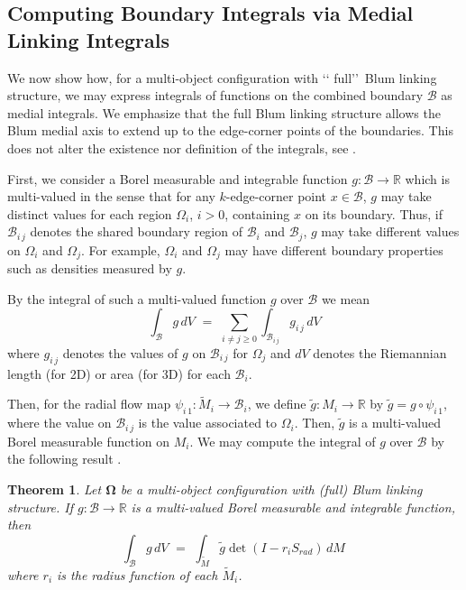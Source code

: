 \documentclass[10pt]{amsart}
\newtheorem{Thm}{Theorem}[section] \newtheorem{TitleThm}[Thm]{}
\theoremstyle{definition}
\theoremstyle{definition}
\numberwithin{equation}{section}
\newcommand{\R}{{\mathbb R}}
\def \bgW {\boldsymbol \Omega}
\def \cB {\mathcal{B}}
\def \gW {\Omega}
\begin{document}
\subsection*{Computing Boundary Integrals via Medial Linking Integrals} 
\par
We now show how, for a multi-object configuration with \lq\lq 
full\rq\rq\, Blum linking structure, we may express integrals of functions 
on the combined boundary $\cB$ as medial integrals.  We emphasize that 
the full Blum linking structure allows the Blum medial axis to extend up 
to the edge-corner points of the boundaries.  This does not alter the 
existence nor definition of the integrals, see \cite[\S 10]{DG}. \par 
First, we consider a Borel measurable and integrable function 
$g : \cB \to \R$
which is multi-valued in the sense that for any $k$-edge-corner point $x 
\in \cB$, 
$g$ may take distinct values for each region $\gW_i$, $i > 0$, containing 
$x$ on its boundary.  Thus, if $\cB_{i\, j}$ denotes the shared boundary 
region of $\cB_i$ and $\cB_j$, $g$ 
may take different values on $\gW_i$ and $\gW_j$.  For example, $\gW_i$ 
and $\gW_j$ may have different boundary properties such as densities 
measured by $g$.  \par
 By the integral of such a multi-valued function $g$ over $\cB$ we mean 
$$  \int_{\cB} g\, dV \,\, = \,\,  \sum_{i \neq j \geq 0} \int_{\cB_{i\, j}} 
g_{i\, j}\, dV $$
where $g_{i\, j}$ denotes the values of $g$ on $\cB_{i\, j}$ for $\gW_j$ 
and $dV$ denotes the Riemannian length (for 2D) or area (for 3D) for each 
$\cB_i$.
\par
Then, for the radial flow map $\psi_{i\, 1} : \tilde M_i \to \cB_i$, we 
define $\tilde g : M_i \to \R$ by $\tilde g = g \circ \psi_{i\, 1}$, where 
the value on $\cB_{i\, j}$ is the value associated to $\gW_i$.  Then, 
$\tilde g$ is a multi-valued Borel measurable function on $M_i$.  
We may compute the integral of $g$ over $\cB$ by the following result 
\cite[Thm 10.1]{DG}.
\begin{Thm}
\label{ThmII5.1}
Let $\bgW$ be a multi-object configuration with (full) Blum linking 
structure.  If $g : \cB \to \R$ is a multi-valued Borel measurable and 
integrable function, then
\begin{equation}
\label{EqnII5.2}
\int_{\cB} g\, dV \,\, = \,\, \int_{\tilde M} \tilde g \det(I - r_i S_{rad})\, 
dM\, 
\end{equation}
where $r_i$ is the radius function of each $\tilde M_i$. 
\end{Thm}
\end{document}
